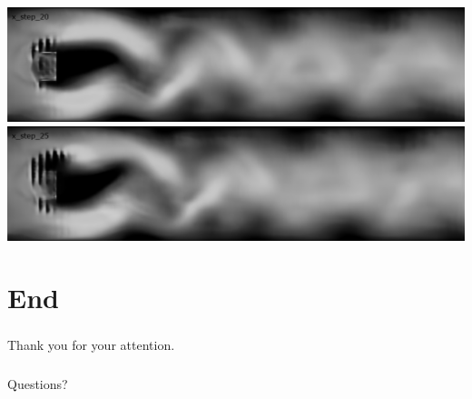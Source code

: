 \documentclass[18pt]{beamer}
\begin{document}
\begin{frame}[t]
\begin{center}
    \includegraphics[scale=0.15]{images/res/x_step_20}
    \includegraphics[scale=0.15]{images/res/x_step_25}
  \end{center}
\end{frame}


\section{End}
\begin{frame}
  \frametitle{}
  \begin{center}
    \huge{Thank you for your attention.}
  \end{center}
\end{frame}

\begin{frame}
  \frametitle{}
  \begin{center}
    \huge{Questions?}
  \end{center}
\end{frame}
\end{document}
